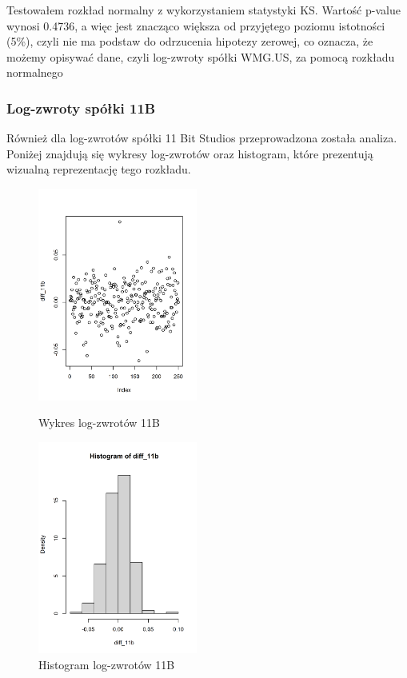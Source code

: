 \documentclass[a4paper,11pt]{article}
\begin{document}
\newpage
Testowałem rozkład normalny z wykorzystaniem statystyki KS. Wartość p-value wynosi 0.4736, a więc jest znacząco większa od przyjętego poziomu istotności (5\%), czyli nie ma podstaw do odrzucenia hipotezy zerowej, co oznacza, że możemy opisywać dane, czyli log-zwroty spółki WMG.US, za pomocą rozkładu normalnego


\subsubsection{Log-zwroty spółki 11B}
Również dla log-zwrotów spółki 11 Bit Studios przeprowadzona została analiza. Poniżej znajdują się wykresy log-zwrotów oraz histogram, które prezentują wizualną reprezentację tego rozkładu.
\begin{figure}[h]
\centering
\begin{minipage}[b]{0.40\textwidth}
\centering
\includegraphics[width=\textwidth, height=7cm, width = 5.25cm]{img/diff_11b.png}
\caption{Wykres log-zwrotów 11B}
\label{fig:r3}
\end{minipage}
\hfill
\begin{minipage}[b]{0.40\textwidth}
\centering
\includegraphics[width=\textwidth, height=7cm, width = 5.25cm]{img/diff_11b_histogram.png}
\caption{Histogram log-zwrotów 11B}
\label{fig:r4}
\end{minipage}
\end{figure}
\end{document}
